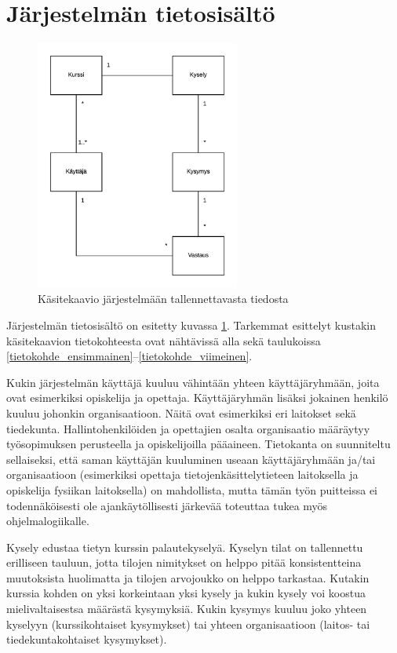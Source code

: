 \documentclass[12pt,a4paper,titlepage]{article}
\begin{document}
\section{Järjestelmän tietosisältö}
\begin{figure}
   \centering
   \includegraphics[width=0.6\textwidth]{kuvat/kasitekaavio.png}
   \caption{Käsitekaavio järjestelmään tallennettavasta tiedosta}\label{fig:kasitekaavio}
\end{figure}

Järjestelmän tietosisältö on esitetty kuvassa \ref{fig:kasitekaavio}. Tarkemmat esittelyt kustakin käsitekaavion tietokohteesta ovat nähtävissä alla sekä taulukoissa \ref{tietokohde_ensimmainen}--\ref{tietokohde_viimeinen}.

Kukin järjestelmän käyttäjä kuuluu vähintään yhteen käyttäjäryhmään, joita ovat esimerkiksi opiskelija ja opettaja. Käyttäjäryhmän lisäksi jokainen henkilö kuuluu johonkin organisaatioon. Näitä ovat esimerkiksi eri laitokset sekä tiedekunta. Hallintohenkilöiden ja opettajien osalta organisaatio määräytyy työsopimuksen perusteella ja opiskelijoilla pääaineen. Tietokanta on suunniteltu sellaiseksi, että saman käyttäjän kuuluminen useaan käyttäjäryhmään ja/tai organisaatioon (esimerkiksi opettaja tietojenkäsittelytieteen laitoksella ja opiskelija fysiikan laitoksella) on mahdollista, mutta tämän työn puitteissa ei todennäköisesti ole ajankäytöllisesti järkevää toteuttaa tukea myös ohjelmalogiikalle.

Kysely edustaa tietyn kurssin palautekyselyä. Kyselyn tilat on tallennettu erilliseen tauluun, jotta tilojen nimitykset on helppo pitää konsistentteina muutoksista huolimatta ja tilojen arvojoukko on helppo tarkastaa. Kutakin kurssia kohden on yksi korkeintaan yksi kysely ja kukin kysely voi koostua mielivaltaisestsa määrästä kysymyksiä. Kukin kysymys kuuluu joko yhteen kyselyyn (kurssikohtaiset kysymykset) tai yhteen organisaatioon (laitos- tai tiedekuntakohtaiset kysymykset).
\end{document}

